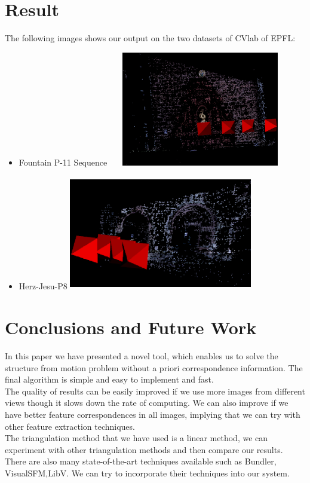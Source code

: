 \documentclass{article}
\begin{document}
\section{Result}
The following images shows our output on the two datasets of CVlab of EPFL:
\begin{itemize}
\item Fountain P-11 Sequence
\includegraphics[width=80mm,height=50mm]{4.eps}
\item Herz-Jesu-P8
\includegraphics[width=80mm,height=50mm]{5.eps}
\end{itemize}

\section{Conclusions and Future Work}
In this paper we have presented a novel tool, which enables us to solve the structure from motion problem
without a priori correspondence information. The final algorithm is simple and easy to implement and fast.\\
The quality of results can be easily improved if we use more images from different views though it slows down the rate of computing. We can also improve if we have better feature correspondences in all images, implying that we can try with other feature extraction techniques.\\
The triangulation method that we have used is a linear method, we can experiment with other triangulation methods and then compare our results. There are also many state-of-the-art techniques available such as Bundler, VisualSFM,LibV. We can try to incorporate their techniques into our system.

\nocite{*}
{}

\end{document}
